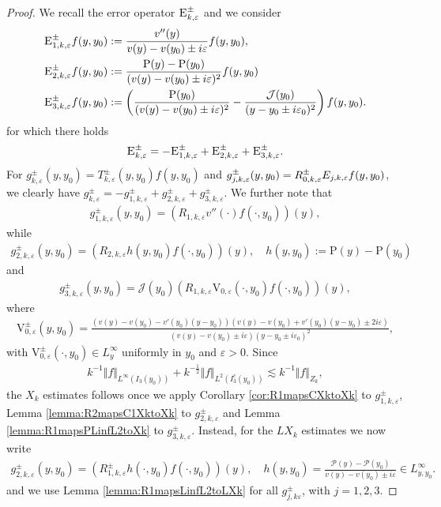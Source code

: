 \documentclass[11pt,reqno]{amsproc}
\theoremstyle{definition}
\numberwithin{equation}{section}
\newcommand{\scE}{{\textsc{E}}}
\newcommand{\cJ}{{\mathcal{J}}}
\newcommand{\ep}{\varepsilon}
\renewcommand{\P}{{\mathcal{P}}}
\begin{document}
\begin{proof}
We recall the error operator $\scE_{k,\ep}^\pm$ and we consider
\begin{align*}
\scE_{1,k,\ep}^\pm f(y,y_0) &:= \frac{v''(y)}{v(y)-v(y_0)\pm i\ep}f(y,y_0) , \\
\scE_{2,k,\ep}^\pm f(y,y_0)&:= \frac{\mathrm{P}(y) - \mathrm{P}(y_0)}{(v(y) - v(y_0) \pm i\ep)^2}f(y,y_0) \\
\scE_{3,k,\ep}^\pm f(y,y_0) &:= \left( \frac{\mathrm{P}(y_0)}{(v(y) - v(y_0) \pm i\ep)^2} - \frac{\cJ(y_0)}{(y-y_0\pm i\ep_0)^2}\right)f(y,y_0). 
\end{align*}
for which there holds
\begin{align*}
\scE_{k,\ep}^\pm = -\scE_{1,k,\ep}^\pm + \scE_{2,k,\ep}^\pm + \scE_{3,k,\ep}^\pm.
\end{align*}
For $g_{k,\ep}^\pm(y,y_0)= T_{k,\ep}^\pm(y,y_0)f(y,y_0)$ and $g_{j,k,\ep}^\pm(y,y_0)=R_{0,k,\ep}^\pm\sc E_{j,k,\ep}f(y,y_0)$, we clearly have $g_{k,\ep}^\pm= -g_{1,k,\ep}^\pm + g_{2,k,\ep}^\pm + g_{3,k,\ep}^\pm$. We further note that
\begin{align*}
g_{1,k,\ep}^\pm(y,y_0) = \left( R_{1,k,\ep}v''(\cdot)f(\cdot,y_0)\right)(y),
\end{align*}
while
\begin{align*}
g_{2,k,\ep}^\pm(y,y_0) = \left(R_{2,k,\ep}  h(y,y_0) f(\cdot, y_0) \right) (y), \quad h(y,y_0):= \mathrm{P}(y) - \mathrm{P}(y_0)
\end{align*}
and 
\begin{align*}
g_{3,k,\ep}^\pm(y,y_0) =\cJ(y_0) \left( R_{1,k,\ep} \mathrm{V}_{0,\ep}(\cdot,y_0)f(\cdot, y_0) \right)(y),
\end{align*}
where
\begin{align*}
\mathrm{V}_{0,\ep}^\pm(y,y_0) = \frac{(v(y) - v(y_0) - v'(y_0)(y-y_0))(v(y)-v(y_0) + v'(y_0)(y-y_0) \pm 2 i\ep)}{(v(y) - v(y_0) \pm i\ep)(y-y_0 \pm i\ep_0)^2},
\end{align*}
with $\mathrm{V}_{0,\ep}^\pm(\cdot,y_0)\in L^\infty_y$ uniformly in $y_0$ and $\ep>0$. Since 
\begin{align*}
k^{-1}\Vert f \Vert_{L^\infty(I_3(y_0))} + k^{-\frac12}\Vert f \Vert_{L^2(I_3^c(y_0))} \lesssim k^{-1}\Vert f \Vert_{Z_k},
\end{align*}
the $X_k$ estimates follows once we apply Corollary \ref{cor:R1mapsCXktoXk} to $g_{1,k,\ep}^\pm$, Lemma \ref{lemma:R2mapsC1XktoXk} to $g_{2,k,\ep}^\pm$ and Lemma \ref{lemma:R1mapsPLinfL2toXk} to $g_{3,k,\ep}^\pm$. Instead, for the $LX_k$ estimates we now write
\begin{align*}
g_{2,k,\ep}^\pm(y,y_0) = \left( R_{1,k,\ep}^\pm h(\cdot,y_0) f(\cdot, y_0) \right)(y), \quad h(y,y_0) = \frac{\P(y) - \P(y_0)}{v(y) - v(y_0)\pm i\ep}\in L^\infty_{y,y_0}.  
\end{align*}
and we use Lemma \ref{lemma:R1mapsLinfL2toLXk} for all $g_{j,k\ep}^\pm$, with $j=1,2,3$.
\end{proof}
\end{document}
